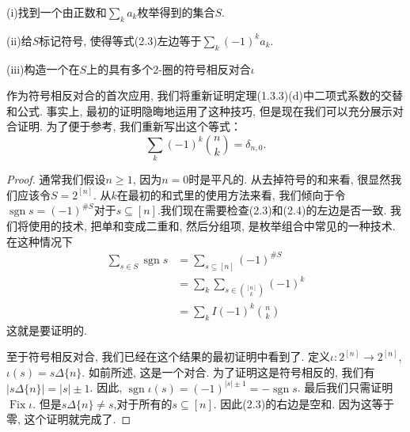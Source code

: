 \documentclass{ctexbook}
\begin{document}
	(i)找到一个由正数和$\sum_{k}a_{k}$枚举得到的集合$S$.

	(ii)给$S$标记符号, 使得等式(2.3)左边等于$\sum_{k}(-1)^{k}a_{k}$.

	(iii)构造一个在$S$上的具有多个2-圈的符号相反对合$\iota $

	作为符号相反对合的首次应用, 我们将重新证明定理(1.3.3)(d)中二项式系数的交替和公式. 事实上, 最初的证明隐晦地运用了这种技巧, 但是现在我们可以充分展示对合证明. 为了便于参考, 我们重新写出这个等式：
\begin{equation}
\sum_{k}(-1)^k\binom{n}{k}=\delta_{n,0}.
\end{equation}
\begin{proof}
	通常我们假设$n\geq 1$, 因为$n=0$时是平凡的. 从去掉符号的和来看, 很显然我们应该令$S=2^{[n]}$. 从$k$在最初的和式里的使用方法来看, 我们倾向于令$\operatorname{sgn}s=(-1)^{\#S}$对于$s\subseteq[n]$.我们现在需要检查(2.3)和(2.4)的左边是否一致. 我们将使用的技术, 把单和变成二重和, 然后分组项, 是枚举组合中常见的一种技术. 在这种情况下
	\[
	\begin{aligned}
	\sum_{s\in S}\operatorname{sgn}s&=\sum_{s\subseteq[n]}(-1)^{\# S}\\
	&=\sum_{k}\sum_{s\in \binom{[n]}{k}}(-1)^{k}\\
	&=\sum_{k}I(-1)^{k} \binom{n}{k}
	\end{aligned}
	\]
	这就是要证明的.
	
	至于符号相反对合, 我们已经在这个结果的最初证明中看到了. 定义$\iota:2^{[n]}\rightarrow 2^{[n]}$, $\iota(s)=s\Delta\{n\}$. 如前所述, 这是一个对合. 为了证明这是符号相反的, 我们有$|s\Delta\{n\}|=|s|\pm 1$. 因此, $\operatorname{sgn}\iota(s)=(-1)^{|s|\pm 1}=-\operatorname{sgn}s$. 最后我们只需证明$\operatorname{Fix}\iota$. 但是$s\Delta\{n\} \neq s$,对于所有的$s\subseteq[n]$. 因此(2.3)的右边是空和. 因为这等于零, 这个证明就完成了. 
\end{proof}
	
\end{document}
